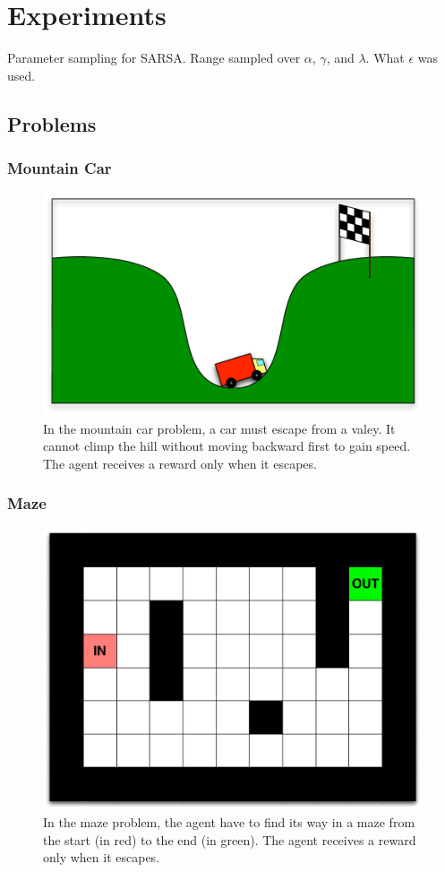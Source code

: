 \section{Experiments}

Parameter sampling for SARSA. Range sampled over $\alpha$, $\gamma$, and $\lambda$. What $\epsilon$ was used.

\subsection{Problems}
\subsubsection{Mountain Car}
\begin{figure}[h]
\center
\includegraphics[width=0.75\linewidth]{MC_problem.pdf}
\caption{In the mountain car problem, a car must escape from a valey. It cannot climp the hill without moving backward first to gain speed. The agent receives a reward only when it escapes.}\label{fig:MC:problem}
\end{figure}

\subsubsection{Maze}
\begin{figure}[h]
\center
\includegraphics[width=0.75\linewidth]{MZ_problem.pdf}
\caption{In the maze problem, the agent have to find its way in a maze from the start (in red) to the end (in green). The agent receives a reward only when it escapes.}\label{fig:MC:problem}
\end{figure}

